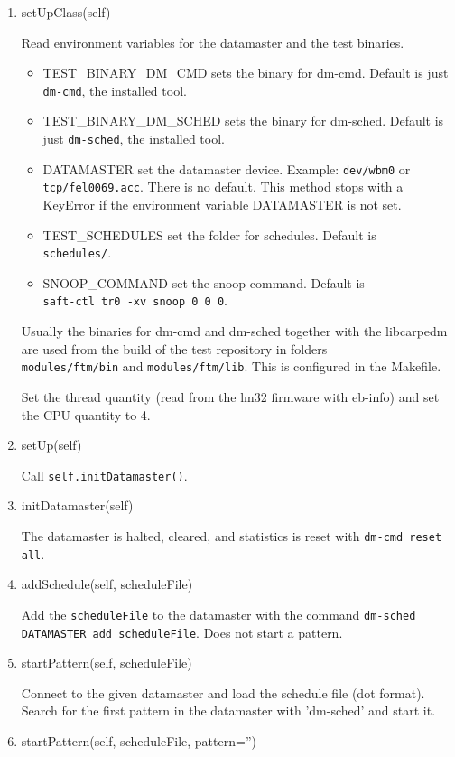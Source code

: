 \documentclass[12pt,a4paper]{report}
\begin{document}
\begin{enumerate}
\item setUpClass(self)

Read environment variables for the datamaster and the test binaries.
\begin{itemize}
\item TEST\_BINARY\_DM\_CMD sets the binary for dm-cmd. Default is just
\texttt{dm-cmd}, the installed tool.
\item TEST\_BINARY\_DM\_SCHED sets the binary for dm-sched. Default is just
\texttt{dm-sched}, the installed tool.
\item DATAMASTER set the datamaster device. Example: \texttt{dev/wbm0} or
\texttt{tcp/fel0069.acc}. There is no default. This method stops with a
KeyError if the environment variable DATAMASTER is not set.
\item TEST\_SCHEDULES set the folder for schedules. Default is \\
 \texttt{schedules/}.
\item SNOOP\_COMMAND set the snoop command. Default is \\
\texttt{saft-ctl tr0 -xv snoop 0 0 0}.
\end{itemize}
Usually the binaries for dm-cmd and dm-sched together with the libcarpedm
are used from the build of the test repository in folders \\
\texttt{modules/ftm/bin} and \texttt{modules/ftm/lib}. This is
configured in the Makefile.

Set the thread quantity (read from the lm32 firmware with eb-info) and
set the CPU quantity to 4.

\item setUp(self)

Call \texttt{self.initDatamaster()}.
\item initDatamaster(self)

The datamaster is halted, cleared, and statistics is reset with
\texttt{dm-cmd reset all}.
\item addSchedule(self, scheduleFile)

Add the \texttt{scheduleFile} to the datamaster with the command
\texttt{dm-sched DATAMASTER add scheduleFile}. Does not start a pattern.
\item startPattern(self, scheduleFile)

Connect to the given datamaster and load the schedule file (dot format).
Search for the first pattern in the datamaster with 'dm-sched' and start it.
\item startPattern(self, scheduleFile, pattern='')


\end{enumerate}
\end{document}
